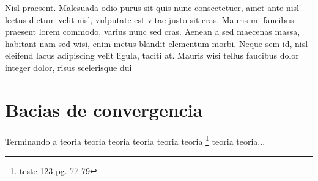     Nisl praesent. Malesuada odio purus sit quis nunc consectetuer, amet ante nisl lectus dictum velit nisl, vulputate est vitae justo sit cras. Mauris mi faucibus praesent lorem commodo, varius nunc sed cras. Aenean a sed maecenas massa, habitant nam sed wisi, enim metus blandit elementum morbi. Neque sem id, nisl eleifend lacus adipiscing velit ligula, taciti at. Mauris wisi tellus faucibus dolor integer dolor, risus scelerisque dui
  
  \section{Bacias de convergencia}
  \label{sec:imgs}

    Terminando a teoria teoria teoria teoria teoria teoria \citep{knuthwebsite}\footnote{teste 123 pg. 77-79} teoria teoria...

